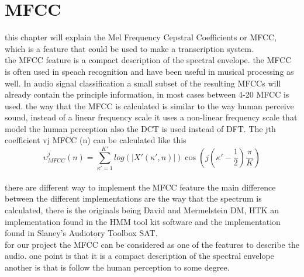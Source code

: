 \section{MFCC}
this chapter will explain the Mel Frequency Cepstral Coefficients or MFCC, which is a feature that could be used to make a transcription system. \\
the MFCC feature is a compact description of the spectral envelope. the MFCC is often used in speach recognition and have been useful in musical processing as well\citep{ACA}. In audio signal classification a small subset of the resulting MFCCs will already contain the principle information, in most cases between 4-20 MFCC is used. the way that the MFCC is calculated is  similar to the way human perceive sound, instead of a linear frequency scale it uses a non-linear frequency scale that model the human perception also the DCT is used instead of DFT\citep{ACA}. The jth coefficient 
vj  MFCC (n) can be calculated like this\citep{ACA}\\
\begin{equation}\label{ eq:MFCC calculation}
	 \upsilon ^j  _{MFCC} (n) = \sum_{\kappa'=1}^{K'} log(\vert X' (\kappa',n) \vert)\cos(j(\kappa' - \frac{1}{2})\frac{\pi}{K})
\end{equation}
\\
there are different way to implement the MFCC feature the main difference between the different implementations are the way that the spectrum is calculated, there is the originals being David and Mermelstein DM, HTK an implementation found in the HMM tool kit software and the implementation found in Slaney's Audiotory Toolbox SAT\citep{ACA}.
\\
for our project the MFCC can be considered as one of the features to describe the audio. one point is that it is a compact description of the spectral envelope another is that is follow the human perception to some degree.